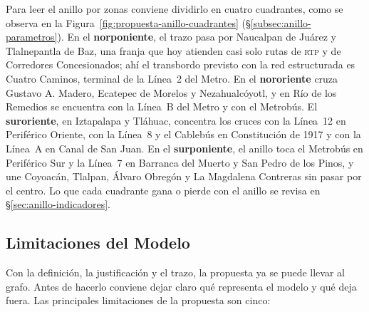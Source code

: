 Para leer el anillo por zonas conviene dividirlo en cuatro cuadrantes, como se
observa en la Figura~\ref{fig:propuesta-anillo-cuadrantes}
(§\ref{subsec:anillo-parametros}). En el
\textbf{norponiente}, el trazo pasa por Naucalpan de Juárez y Tlalnepantla de
Baz, una franja que hoy atienden casi solo rutas de \textsc{rtp} y de
Corredores Concesionados; ahí el transbordo previsto con la red estructurada
es Cuatro Caminos, terminal de la Línea~2 del Metro. En el \textbf{nororiente}
cruza Gustavo A. Madero, Ecatepec de Morelos y Nezahualcóyotl, y en Río de los
Remedios se encuentra con la Línea~B del Metro y con el Metrobús. El
\textbf{suroriente}, en Iztapalapa y Tláhuac, concentra los cruces con la
Línea~12 en Periférico Oriente, con la Línea~8 y el Cablebús en Constitución
de 1917 y con la Línea~A en Canal de San Juan. En el \textbf{surponiente}, el
anillo toca el Metrobús en Periférico Sur y la Línea~7 en Barranca del Muerto
y San Pedro de los Pinos, y une Coyoacán, Tlalpan, Álvaro Obregón y La
Magdalena Contreras sin pasar por el centro. Lo que cada cuadrante gana o
pierde con el anillo se revisa en §\ref{sec:anillo-indicadores}.

\subsection{Limitaciones del Modelo}
\label{subsec:corredor-anillar-limitaciones}

Con la definición, la justificación y el trazo, la propuesta ya se puede
llevar al grafo. Antes de hacerlo conviene dejar claro qué representa el modelo
y qué deja fuera. Las principales limitaciones de la propuesta son cinco:


